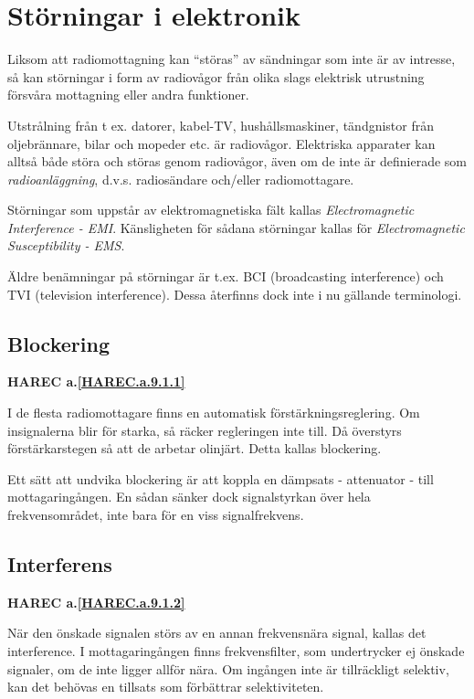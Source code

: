 \section{Störningar i elektronik}

Liksom att radiomottagning kan ``störas'' av sändningar som inte är av
intresse, så kan störningar i form av radiovågor från olika slags
elektrisk utrustning försvåra mottagning eller andra funktioner.

Utstrålning från t ex. datorer, kabel-TV, hushållsmaskiner,
tändgnistor från oljebrännare, bilar och mopeder etc. är radiovågor.
Elektriska apparater kan alltså både störa och störas genom
radiovågor, även om de inte är definierade som \emph{radioanläggning},
d.v.s. radiosändare och/eller radiomottagare.

Störningar som uppstår av elektromagnetiska fält kallas
\emph{Electromagnetic Interference - EMI}. Känsligheten för sådana
störningar kallas för \emph{Electromagnetic Susceptibility - EMS}.

Äldre benämningar på störningar är t.ex. BCI (broadcasting
interference) och TVI (television interference). Dessa återfinns dock
inte i nu gällande terminologi.

\subsection{Blockering}
\textbf{
HAREC a.\ref{HAREC.a.9.1.1}\label{myHAREC.a.9.1.1}
}

I de flesta radiomottagare finns en automatisk
förstärkningsreglering. Om insignalerna blir för starka, så räcker
regleringen inte till.  Då överstyrs förstärkarstegen så att de
arbetar olinjärt. Detta kallas blockering.

Ett sätt att undvika blockering är att koppla en dämpsats -
attenuator - till mottagaringången. En sådan sänker dock signalstyrkan
över hela frekvensområdet, inte bara för en viss signalfrekvens.

\subsection{Interferens}
\textbf{
HAREC a.\ref{HAREC.a.9.1.2}\label{myHAREC.a.9.1.2}
}

När den önskade signalen störs av en annan frekvensnära signal, kallas
det interference. I mottagaringången finns frekvensfilter, som
undertrycker ej önskade signaler, om de inte ligger allför nära. Om
ingången inte är tillräckligt selektiv, kan det behövas en tillsats
som förbättrar selektiviteten.

